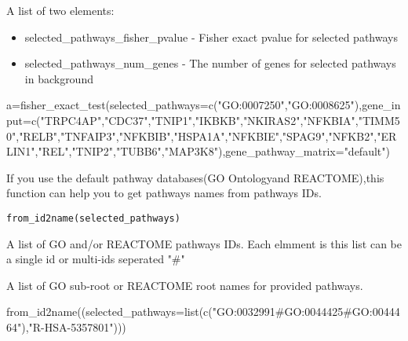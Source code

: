 \documentclass[a4paper]{book}
\begin{document}
%
\begin{Value}
A list of two elements: 
\begin{itemize}

\item selected\_pathways\_fisher\_pvalue - Fisher exact pvalue for selected pathways
\item selected\_pathways\_num\_genes - The number of genes for selected pathways in background

\end{itemize}

\end{Value}
%
\begin{Examples}
\begin{ExampleCode}
a=fisher_exact_test(selected_pathways=c("GO:0007250","GO:0008625"),gene_input=c("TRPC4AP","CDC37","TNIP1","IKBKB","NKIRAS2","NFKBIA","TIMM50","RELB","TNFAIP3","NFKBIB","HSPA1A","NFKBIE","SPAG9","NFKB2","ERLIN1","REL","TNIP2","TUBB6","MAP3K8"),gene_pathway_matrix="default")
\end{ExampleCode}
\end{Examples}
%
\begin{Description}\relax
If you use the default pathway databases(GO Ontologyand REACTOME),this function can help you to get pathways names from pathways IDs.
\end{Description}
%
\begin{Usage}
\begin{verbatim}
from_id2name(selected_pathways)
\end{verbatim}
\end{Usage}
%
\begin{Arguments}
\begin{ldescription}
\item[\code{selected\_pathways}] A list of GO and/or REACTOME pathways IDs. Each elmment is this list can be a single id or multi-ids seperated "\#"
\end{ldescription}
\end{Arguments}
%
\begin{Value}
A list of GO sub-root or REACTOME root names for provided pathways.
\end{Value}
%
\begin{Examples}
\begin{ExampleCode}
from_id2name((selected_pathways=list(c("GO:0032991#GO:0044425#GO:0044464"),"R-HSA-5357801")))
\end{ExampleCode}
\end{Examples}
\end{document}
